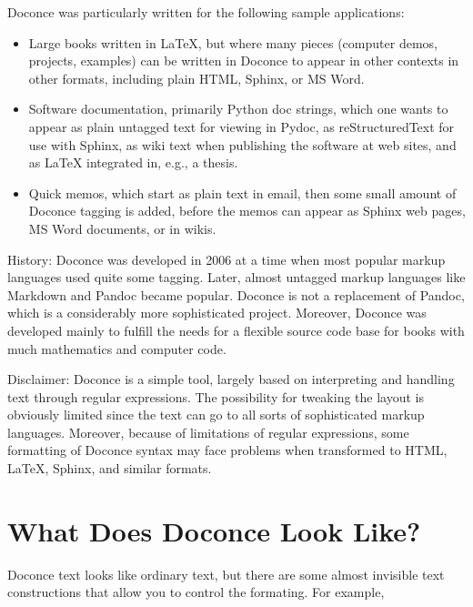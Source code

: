 \documentclass{article}
\begin{document}
\noindent
Doconce was particularly written for the following sample applications:

\begin{itemize}
  \item Large books written in {\LaTeX}, but where many pieces (computer demos,
    projects, examples) can be written in Doconce to appear in other
    contexts in other formats, including plain HTML, Sphinx, or MS Word.

  \item Software documentation, primarily Python doc strings, which one wants
    to appear as plain untagged text for viewing in Pydoc, as reStructuredText
    for use with Sphinx, as wiki text when publishing the software at
    web sites, and as {\LaTeX} integrated in, e.g., a thesis.

  \item Quick memos, which start as plain text in email, then some small
    amount of Doconce tagging is added, before the memos can appear as
    Sphinx web pages, MS Word documents, or in wikis.
\end{itemize}

\noindent
History: Doconce was developed in 2006 at a time when most popular
markup languages used quite some tagging.  Later, almost untagged
markup languages like Markdown and Pandoc became popular. Doconce is
not a replacement of Pandoc, which is a considerably more
sophisticated project. Moreover, Doconce was developed mainly to
fulfill the needs for a flexible source code base for books with much
mathematics and computer code.

Disclaimer: Doconce is a simple tool, largely based on interpreting
and handling text through regular expressions. The possibility for
tweaking the layout is obviously limited since the text can go to
all sorts of sophisticated markup languages. Moreover, because of
limitations of regular expressions, some formatting of Doconce syntax
may face problems when transformed to HTML, {\LaTeX}, Sphinx, and similar
formats. 


\section{What Does Doconce Look Like?}

Doconce text looks like ordinary text, but there are some almost invisible
text constructions that allow you to control the formating. For example,
\end{document}
